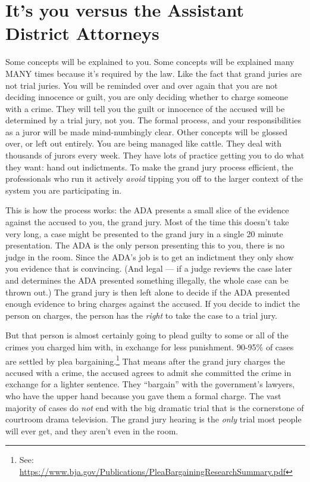 \documentclass[letterpaper]{article}
\begin{document}
\section*{It's you versus the Assistant District Attorneys}
Some concepts will be explained to you. 
Some concepts will be explained many MANY times because it's required by the law.
Like the fact that grand juries are not trial juries. 
You will be reminded over and over again that you are not deciding innocence or guilt, you are only deciding whether to charge someone with a crime. 
They will tell you the guilt or innocence of the accused will be determined by a trial jury, not you.
The formal process, and your responsibilities as a juror will be made mind-numbingly clear. Other concepts will be glossed over, or left out entirely.
You are being managed like cattle.
They deal with thousands of jurors every week.
They have lots of practice getting you to do what they want: hand out indictments.
To make the grand jury process efficient, the professionals who run it actively \emph{avoid} tipping you off to the larger context of the system you are participating in. 

This is how the process works: the ADA presents a small slice of the evidence against the accused to you, the grand jury. 
Most of the time this doesn't take very long, a case might be presented to the grand jury in a single 20 minute presentation.
The ADA is the only person presenting this to you, there is no judge in the room.
Since the ADA's job is to get an indictment they only show you evidence that is convincing. 
(And legal --- if a judge reviews the case later and determines the ADA presented something illegally, the whole case can be thrown out.)
The grand jury is then left alone to decide if the ADA presented enough evidence to bring charges against the accused.
If you decide to indict the person on charges, the person has the \emph{right} to take the case to a trial jury. 

But that person is almost certainly going to plead guilty to some or all of the crimes you charged him with, in exchange for less punishment. 
90-95\% of cases are settled by plea bargaining.\footnote{See: \url{https://www.bja.gov/Publications/PleaBargainingResearchSummary.pdf}}
That means after the grand jury charges the accused with a crime, the accused agrees to admit she committed the crime in exchange for a lighter sentence.
They ``bargain'' with the government's lawyers, who have the upper hand because you gave them a formal charge.
The vast majority of cases do \emph{not} end with the big dramatic trial that is the cornerstone of courtroom drama television.
The grand jury hearing is the \emph{only} trial most people will ever get, and they aren't even in the room. 
\end{document}
